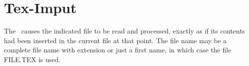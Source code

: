 \section {Tex-Imput}

The \ causes the indicated file to be read and processed,
exactly as if its contents had been inserted in the current file at that
point. The file name may be a complete file name with extension or just a
first name, in which case the file FILE.TEX is used.